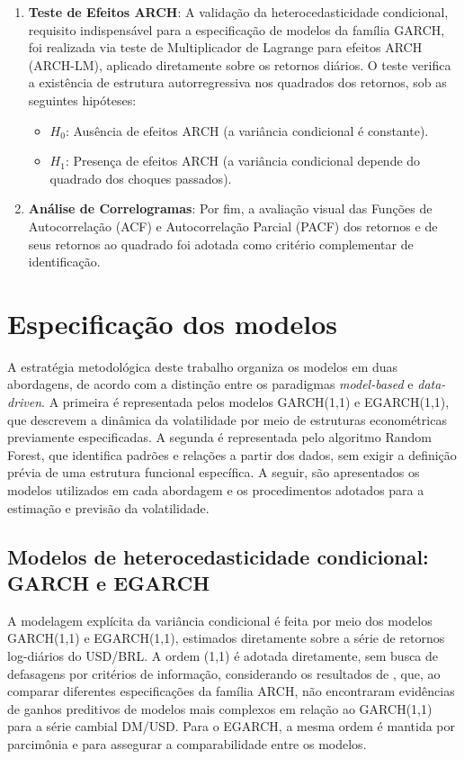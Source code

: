 \begin{enumerate}
    \item \textbf{Teste de Efeitos ARCH}:
    A validação da heterocedasticidade condicional, requisito indispensável para a especificação de modelos da família GARCH, foi realizada via teste de Multiplicador de Lagrange para efeitos ARCH (ARCH-LM), aplicado diretamente sobre os retornos diários. O teste verifica a existência de estrutura autorregressiva nos quadrados dos retornos, sob as seguintes hipóteses:
    \begin{itemize}
        \item[] $H_0$: Ausência de efeitos ARCH (a variância condicional é constante).
        \item[] $H_1$: Presença de efeitos ARCH (a variância condicional depende do quadrado dos choques passados).
    \end{itemize}

    \item \textbf{Análise de Correlogramas}:
    Por fim, a avaliação visual das Funções de Autocorrelação (ACF) e Autocorrelação Parcial (PACF) dos retornos e de seus retornos ao quadrado foi adotada como critério complementar de identificação.
\end{enumerate}

\section{Especificação dos modelos}

A estratégia metodológica deste trabalho organiza os modelos em duas abordagens, de acordo com a distinção entre os paradigmas \textit{model-based} e \textit{data-driven}. A primeira é representada pelos modelos GARCH(1,1) 
e EGARCH(1,1), que descrevem a dinâmica da volatilidade por meio de estruturas econométricas previamente especificadas. A segunda é representada pelo algoritmo Random Forest, que identifica padrões e 
relações a partir dos dados, sem exigir a definição prévia de uma estrutura funcional específica. A seguir, são apresentados os modelos utilizados em cada abordagem e os procedimentos adotados para a 
estimação e previsão da volatilidade.

\subsection{Modelos de heterocedasticidade condicional: GARCH e EGARCH}
A modelagem explícita da variância condicional é feita por meio dos modelos GARCH(1,1) e EGARCH(1,1), estimados diretamente sobre a série 
de retornos log-diários do USD\slash BRL. A ordem (1,1) é adotada diretamente, sem busca de defasagens por critérios de informação, considerando os resultados de \textcite{hansen2005forecast}, 
que, ao comparar diferentes especificações da família ARCH, não encontraram evidências de ganhos preditivos de modelos mais complexos em relação ao GARCH(1,1) para a série cambial DM/USD. 
Para o EGARCH, a mesma ordem é mantida por parcimônia e para assegurar a comparabilidade entre os modelos.

